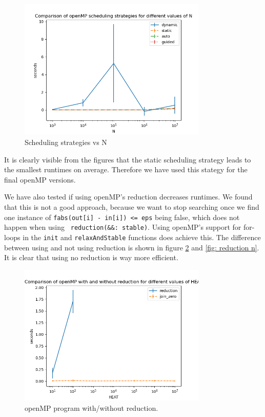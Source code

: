 \documentclass[a4paper]{article}
\begin{document}
\begin{figure}[H]
    \centering
    \includegraphics[width = 0.8\textwidth]{graphs/n/Comparison of openMP scheduling strategies for different values of N.png}
    \caption{Scheduling strategies vs N}
    \label{fig: orig heat}
\end{figure}

It is clearly visible from the figures that the static scheduling strategy leads to the smallest runtimes on average. Therefore we have used this stategy for the final openMP versions.

We have also tested if using openMP's reduction decreases runtimes. We found that this is not a good approach, because we want to stop searching once we find one instance of \texttt{fabs(out[i] - in[i]) <= eps} being false, which does not happen when using \texttt{ reduction(\&\&: stable)}. Using openMP's support for for-loops in the \texttt{init} and \texttt{relaxAndStable} functions does achieve this. The difference between using and not using reduction is shown in figure \ref{fig: reduction heat} and \ref{fig: reduction n}. It is clear that using no reduction is way more efficient.

\begin{figure}[H]
    \centering
    \includegraphics[width = 0.8\textwidth]{graphs/heat/Comparison of openMP with and without reduction for different values of HEAT.png}
    \caption{openMP program with/without reduction.}
    \label{fig: reduction heat}
\end{figure}
\end{document}
